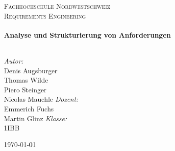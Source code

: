 \begin{titlepage}
\begin{center}
\textsc{\LARGE Fachhochschule Nordwestschweiz}\\[1.5cm]
\textsc{\Large Requirements Engineering}\\[0.5cm]
\HRule \\[0.4cm]
{ \huge \bfseries Analyse und Strukturierung von Anforderungen}\\[0.4cm]
\HRule \\[1.5cm]
\begin{minipage}{1.2\textwidth}
\begin{flushleft} \large
\emph{Autor:}\\
Denis Augsburger\\
Thomas Wilde\\
Piero Steinger\\
Nicolas Mauchle
\newline
\newline
\emph{Dozent:} \\
Emmerich Fuchs\\
Martin Glinz
\newline
\newline
\emph{Klasse:} \\
1IBB\\
\end{flushleft}
\end{minipage}
\vfill
{\large \today}
\end{center}
\end{titlepage}
